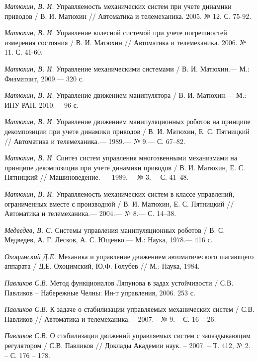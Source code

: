 \begin{thebibliography}{10}
	{\it Матюхин, В. И.} Управляемость механических систем при учете динамики приводов / В. И. Матюхин // Автоматика и телемеханика. 2005. № 12. С. 75-92.
	
	{\it Матюхин, В. И.} Управление колесной системой при учете погрешностей измерения состояния / В. И. Матюхин // Автоматика и телемеханика. 2006. № 11. С. 41-60.
	
	{\it Матюхин, В. И.} Управление механическими системами / В. И. Матюхин.— М.: Физматлит,
	2009.— 320 с.
	
	{\it Матюхин, В. И.} Управление движением манипулятора / В. И. Матюхин.— М.: ИПУ
	РАН, 2010.— 96 с.
	
	{\it Матюхин, В. И.} Управление движением манипуляционных роботов на принципе декомпозиции при учете динамики приводов
	/ В. И. Матюхин, Е. С. Пятницкий // Автоматика и телемеханика.— 1989.— № 9.— С. 67–82.
	
	{\it Матюхин, В. И.} Синтез систем управления многозвенными механизмами на принципе декомпозиции при учете динамики приводов / В. И. Матюхин, Е. С. Пятницкий // Машиноведение. — 1989.— № 3.— С. 41–48.
	
	{\it Матюхин, В. И.} Управляемость механических систем в классе управлений, ограниченных вместе с производной
	/ В. И. Матюхин, Е. С. Пятницкий // Автоматика и телемеханика.— 2004.— № 8.— С. 14–38.
	
	{\it Медведев, В. С.} Системы управления манипуляционных роботов / В. С. Медведев,
	А. Г. Лесков, А. С. Ющенко.— М.: Наука, 1978.— 416 с.
	
	
	{\it Охоцимский Д.Е.} Механика и управление движением автоматического шагающего аппарата / Д.Е. Охоцимский, Ю.Ф. Голубев // М.: Наука, 1984.
	
	{\it Павликов С.В.} Метод функционалов Ляпунова в задах устойчивости / С.В. Павликов – Набережные Челны: Ин-т управления, 2006. 253 с.
	
	{\it Павликов С.В.} К задаче о стабилизации управляемых механических систем / С.В. Павликов // Автоматика и телемеханика. – 2007. - № 9. – С. 16 	– 26.
	
	{\it Павликов С.В.} О стабилизации движений управляемых систем с запаздывающим регулятором / С.В. Павликов // Доклады Академии наук. – 2007. – 		Т. 412, № 2. – С. 176 – 178.
	

\end{thebibliography}
